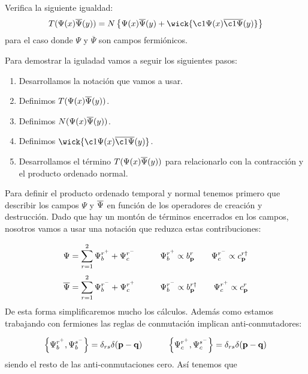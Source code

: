 \begin{ejercicio} 
	Verifica la siguiente igualdad:
	\begin{equation*}
		T(\Psi(x) \aPsi(y)) = N\left\lbrace \Psi (x)\overline{\Psi} (y)+ \wick{\c1{\Psi} (x) \overline{\c1{\Psi}} (y)} \right\rbrace
	\end{equation*}
	para el caso donde $\Psi$ y $\overline{\Psi}$ son campos fermiónicos.
\end{ejercicio}
\begin{solucion} 
	Para demostrar la iguladad vamos a seguir los siguientes pasos:
	\begin{enumerate}
		\item Desarrollamos la notación que vamos a usar.
		\item Definimos $T(\Psi(x) \overline{\Psi}(y))$.
		\item Definimos $N(\Psi(x) \overline{\Psi}(y))$.
		\item Definimos $\wick{\c1{\Psi} (x) \overline{\c1{\Psi}} (y)}$.
		\item Desarrollamos el término $T(\Psi(x) \overline{\Psi}(y))$ para relacionarlo con la contracción y el producto ordenado normal.
	\end{enumerate}
	Para definir el producto ordenado temporal y normal tenemos primero que describir los campos $\Psi$ y $\overline{\Psi}$ en función de los operadores de creación y destrucción. Dado que hay un montón de términos encerrados en los campos, nosotros vamos a usar una notación que reduzca estas contribuciones:
	
	\begin{equation*}
		\Psi = \sum_{r=1}^2 \Psi_b^{r^+} + \Psi_c^{r^-} \quad \quad \quad \Psi_b^{r^+}  \propto b^r_{\mathbf{p}} \quad \quad \Psi_c^{r^-} \propto c_{\mathbf{p}}^{r\dagger}
	\end{equation*}
	\begin{equation*}
		\overline{\Psi} = \sum_{r=1}^2 \Psi_b^{r^-}+\Psi_c^{r^+}\quad \quad \quad \Psi_b^{r^-}  \propto b^{r\dagger}_{\mathbf{p}} \quad \quad \Psi_c^{r^+} \propto c_{\mathbf{p}}^{r}
	\end{equation*}
	De esta forma simplificaremos mucho los cálculos. Además como estamos trabajando con fermiones las reglas de conmutación implican anti-conmutadores:
	
	\begin{equation*}
		\left\lbrace \Psi_b^{r^+}, \Psi_b^{s^-} \right\rbrace = \delta_{rs} \delta (\mathbf{p}-\mathbf{q}) \quad \quad \quad 
		\left\lbrace \Psi_c^{r^+}, \Psi_c^{s^-}\right\rbrace = \delta_{rs} \delta (\mathbf{p}-\mathbf{q}) 
	\end{equation*} 
	siendo el resto de las anti-conmutaciones cero. Así tenemos que
	

\end{solucion}
